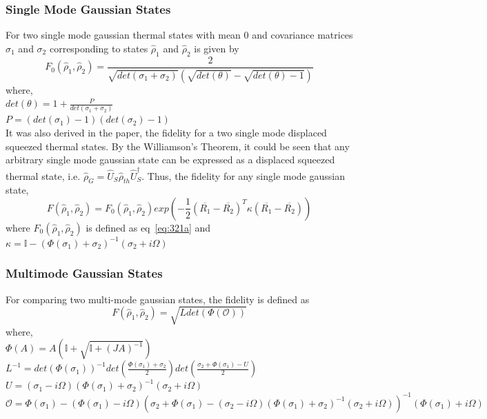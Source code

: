\subsubsection{Single Mode Gaussian States}
For two single mode gaussian thermal states with mean 0 and covariance matrices $\sigma_1$ and $\sigma_2$ corresponding to states $\hat{\rho}_1$ and $\hat{\rho}_2$ is given by
\begin{equation}
    F_0(\hat{\rho}_1, \hat{\rho}_2) = \frac{2}{\sqrt{det(\sigma_1 + \sigma_2)} (\sqrt{det(\theta)}-\sqrt{det(\theta) - 1})}
    \label{eq:321a}
\end{equation}
where,\\
$det(\theta) = 1 + \frac{P}{det(\sigma_1 + \sigma_2)}$\\
$P = (det(\sigma_1) - 1)(det(\sigma_2) - 1)$\\
It was also derived in the paper, the fidelity for a two single mode displaced squeezed thermal states. By the Williamson's Theorem, it could be seen that any arbitrary single mode gaussian state can be expressed as a displaced squeezed thermal state, i.e. $\hat{\rho}_G = \hat{U}_S \hat{\rho}_{th} \hat{U}_S^{\dag}$. Thus, the fidelity for any single mode gaussian state,
\begin{equation}
    F(\hat{\rho}_1, \hat{\rho}_2) = F_0(\hat{\rho}_1, \hat{\rho}_2) exp\left(-\frac{1}{2}(\overline{R_1} - \overline{R_2})^T \kappa (\overline{R_1} - \overline{R_2})\right)
\end{equation}
where $F_0(\hat{\rho}_1, \hat{\rho}_2)$ is defined as eq~\ref{eq:321a}  and $\kappa = \mathbb{I} - (\Phi(\sigma_1) + \sigma_2)^{-1} (\sigma_2 + i \Omega)$

\subsubsection{Multimode Gaussian States}
For comparing two multi-mode gaussian states, the fidelity is defined as \cite{multimode}
$$F(\hat{\rho}_1, \hat{\rho}_2) = \sqrt{L det(\Phi(\mathcal{O}))}$$
where,\\
$\Phi(A) = A(\mathbb{I} + \sqrt{\mathbb{I} + (J A)^{-1}})$\\
$L^{-1} = det(\Phi(\sigma_1))^{-1} det(\frac{\Phi(\sigma_1) + \sigma_2}{2}) det(\frac{\sigma_2 + \Phi(\sigma_1) - U}{2})$\\
$U = (\sigma_1 - i \Omega)(\Phi(\sigma_1) + \sigma_2)^{-1}(\sigma_2 + i \Omega)$\\
$\mathcal{O} = \Phi(\sigma_1) - (\Phi(\sigma_1) - i\Omega) \left( \sigma_2 + \Phi(\sigma_1) - (\sigma_2 - i\Omega)(\Phi(\sigma_1) + \sigma_2)^{-1}(\sigma_2 + i\Omega) \right)^{-1} (\Phi(\sigma_1) + i\Omega)$